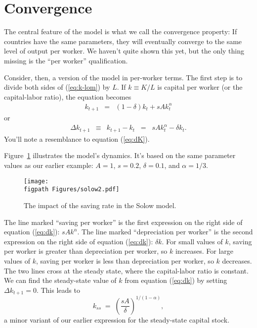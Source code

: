 \section{Convergence}

The central feature of the model is what we call the convergence property:
If countries have the same parameters, they will eventually converge to the same
level of output per worker.
We haven't quite shown this yet, but the only thing missing
is the ``per worker'' qualification.


Consider, then, a version of the model in per-worker terms.
The first step is to divide both sides of (\ref{eq:k-lom}) by $L$.
If $k \equiv K/L$ is capital per worker (or the capital-labor ratio), the equation becomes
\begin{eqnarray*}
   k_{t+1} &=& (1-\delta) k_t + s A k_{t}^{\alpha}
\end{eqnarray*}
or
\begin{eqnarray}
   \Delta k_{t+1} &\equiv& k_{t+1} - k_t
            \;\;=\;\; s A k_{t}^{\alpha} - \delta k_t  .
   \label{eq:dk}
\end{eqnarray}
You'll note a resemblance to equation (\ref{eq:dK}).

Figure~\ref{fig:solow2} illustrates the model's dynamics.
It's based on the same parameter values as our earlier example:
$ A = 1$, $s = 0.2$, $\delta = 0.1$, and $\alpha = 1/3$.
\begin{figure}[h]
\caption{The impact of the saving rate in the Solow model.}
    \label{fig:solow2}
    \centering
    \texttt{[image: \\figpath Figures/solow2.pdf]}\\
\end{figure}
The line marked ``saving per worker'' is the first expression on
the right side of equation (\ref{eq:dk}):  $ s A k^\alpha $. The
line marked ``depreciation per worker'' is the second expression
on the right side of equation (\ref{eq:dk}):  $\delta k$. For
small values of $k$, saving per worker is greater than
depreciation per worker, so $k$ increases. For large values of
$k$, saving per worker is less than depreciation per worker, so
$k$ decreases. The two lines cross at the steady state, where the
capital-labor ratio is constant. We can find the steady-state
value of $k$ from equation (\ref{eq:dk}) by setting $\Delta
k_{t+1} = 0$.  This leads to
\[
    k_{ss} \;=\; \left( \frac{sA}{\delta} \right)^{1/(1-\alpha)} ,
\]
a minor variant of our earlier expression for the steady-state capital stock.


